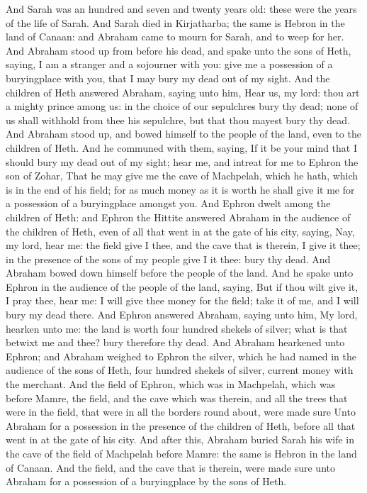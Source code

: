 \begin{biblechapter} %
\verse And Sarah was an hundred and seven and twenty years old: these were the years of the life of Sarah.
\verse And Sarah died in Kirjatharba; the same is Hebron in the land of Canaan: and Abraham came to mourn for Sarah, and to weep for her.
\verse And Abraham stood up from before his dead, and spake unto the sons of Heth, saying,
\verse I am a stranger and a sojourner with you: give me a possession of a buryingplace with you, that I may bury my dead out of my sight.
\verse And the children of Heth answered Abraham, saying unto him,
\verse Hear us, my lord: thou art a mighty prince among us: in the choice of our sepulchres bury thy dead; none of us shall withhold from thee his sepulchre, but that thou mayest bury thy dead.
\verse And Abraham stood up, and bowed himself to the people of the land, even to the children of Heth.
\verse And he communed with them, saying, If it be your mind that I should bury my dead out of my sight; hear me, and intreat for me to Ephron the son of Zohar,
\verse That he may give me the cave of Machpelah, which he hath, which is in the end of his field; for as much money as it is worth he shall give it me for a possession of a buryingplace amongst you.
\verse And Ephron dwelt among the children of Heth: and Ephron the Hittite answered Abraham in the audience of the children of Heth, even of all that went in at the gate of his city, saying,
\verse Nay, my lord, hear me: the field give I thee, and the cave that is therein, I give it thee; in the presence of the sons of my people give I it thee: bury thy dead.
\verse And Abraham bowed down himself before the people of the land.
\verse And he spake unto Ephron in the audience of the people of the land, saying, But if thou wilt give it, I pray thee, hear me: I will give thee money for the field; take it of me, and I will bury my dead there.
\verse And Ephron answered Abraham, saying unto him,
\verse My lord, hearken unto me: the land is worth four hundred shekels of silver; what is that betwixt me and thee? bury therefore thy dead.
\verse And Abraham hearkened unto Ephron; and Abraham weighed to Ephron the silver, which he had named in the audience of the sons of Heth, four hundred shekels of silver, current money with the merchant.
\verse And the field of Ephron, which was in Machpelah, which was before Mamre, the field, and the cave which was therein, and all the trees that were in the field, that were in all the borders round about, were made sure
\verse Unto Abraham for a possession in the presence of the children of Heth, before all that went in at the gate of his city.
\verse And after this, Abraham buried Sarah his wife in the cave of the field of Machpelah before Mamre: the same is Hebron in the land of Canaan.
\verse And the field, and the cave that is therein, were made sure unto Abraham for a possession of a buryingplace by the sons of Heth.
\end{biblechapter}

